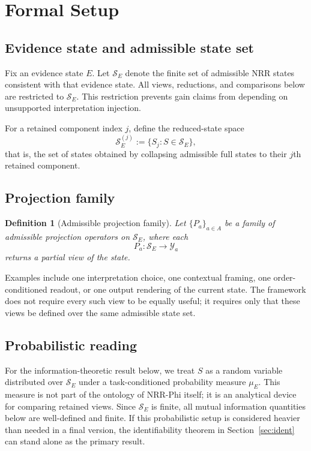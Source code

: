 \documentclass[11pt,a4paper]{article}
\newtheorem{definition}{Definition}
\begin{document}
\section{Formal Setup}
\label{sec:setup}

\subsection{Evidence state and admissible state set}

Fix an evidence state $E$. Let $\mathcal{S}_E$ denote the finite set of admissible NRR states consistent with that evidence state. All views, reductions, and comparisons below are restricted to $\mathcal{S}_E$. This restriction prevents gain claims from depending on unsupported interpretation injection.

For a retained component index $j$, define the reduced-state space
\begin{equation}
\mathcal{S}_E^{(j)} := \{S_j : S \in \mathcal{S}_E\},
\end{equation}
that is, the set of states obtained by collapsing admissible full states to their $j$th retained component.

\subsection{Projection family}

\begin{definition}[Admissible projection family]
Let $\{P_a\}_{a \in A}$ be a family of admissible projection operators on $\mathcal{S}_E$, where each
\begin{equation}
P_a : \mathcal{S}_E \to \mathcal{Y}_a
\end{equation}
returns a partial view of the state.
\end{definition}

Examples include one interpretation choice, one contextual framing, one order-conditioned readout, or one output rendering of the current state. The framework does not require every such view to be equally useful; it requires only that these views be defined over the same admissible state set.

\subsection{Probabilistic reading}

For the information-theoretic result below, we treat $S$ as a random variable distributed over $\mathcal{S}_E$ under a task-conditioned probability measure $\mu_E$. This measure is not part of the ontology of NRR-Phi \cite{saito2026phi} itself; it is an analytical device for comparing retained views. Since $\mathcal{S}_E$ is finite, all mutual information quantities below are well-defined and finite. If this probabilistic setup is considered heavier than needed in a final version, the identifiability theorem in Section~\ref{sec:ident} can stand alone as the primary result.
\end{document}
